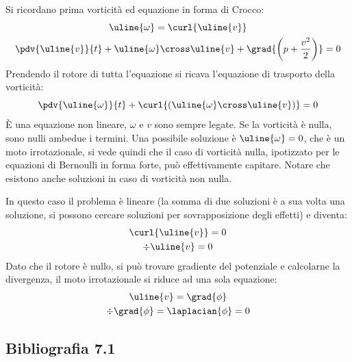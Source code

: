 Si ricordano prima vorticità ed equazione in forma di Crocco:
%
	\begin{equation*}
		\begin{gathered}
			\uline{\omega} = \curl{\uline{v}}\\
			\pdv{\uline{v} }{t} + \uline{\omega} \cross \uline{v} + \grad{\left( p + \frac{v^2}{2} \right)} = 0
		\end{gathered}
	\end{equation*}
%
Prendendo il rotore di tutta l'equazione si ricava l'equazione di trasporto della vorticità:
%
	\begin{equation*}
		\pdv{\uline{\omega}}{t} + \curl{\left( \uline{\omega} \cross \uline{v} \right)} = 0
	\end{equation*}
%
È una equazione non lineare, $\omega$ e $v$ sono sempre legate.
Se la vorticità è nulla, sono nulli ambedue i termini.
Una possibile soluzione è $\uline{\omega} = 0$, che è un moto irrotazionale, si vede quindi che il caso di vorticità nulla, ipotizzato per le equazioni di Bernoulli in forma forte, può effettivamente capitare.
Notare che esistono anche soluzioni in caso di vorticità non nulla.

In questo caso il problema è lineare (la somma di due soluzioni è a sua volta una soluzione, si possono cercare soluzioni per sovrapposizione degli effetti) e diventa:
%
	\begin{equation*}
		\begin{gathered}
			\curl{\uline{v}} = 0\\
			\div{\uline{v}} = 0
			\end{gathered}
	\end{equation*}
%
Dato che il rotore è nullo, si può trovare gradiente del potenziale e calcolarne la divergenza, il moto irrotazionale si riduce ad una sola equazione:
%
	\begin{equation*}
		\begin{gathered}
			\uline{v} = \grad{\phi}\\
			\div{\grad{\phi}} = \laplacian{\phi} = 0
		\end{gathered}
	\end{equation*}
%

\subsection*{Bibliografia 7.1}
\cite[Cap.\ 10.4]{CengelCimbala}\\
\cite[Cap.\ 10.1, 10.2]{PnueliGutfinger}